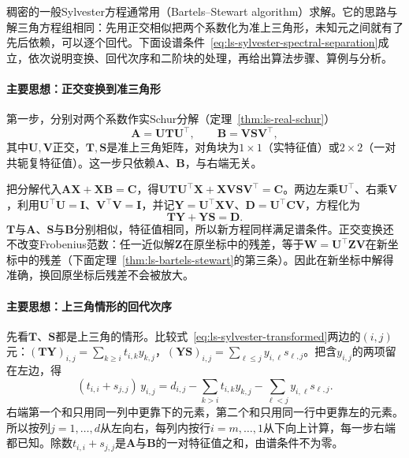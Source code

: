 稠密的一般Sylvester方程通常用（Bartels--Stewart algorithm）求解。它的思路与解三角方程组相同：先用正交相似把两个系数化为准上三角形，未知元之间就有了先后依赖，可以逐个回代。下面设谱条件~\eqref{eq:ls-sylvester-spectral-separation}成立，依次说明变换、回代次序和二阶块的处理，再给出算法步骤、算例与分析。

\paragraph{主要思想：正交变换到准三角形}
第一步，分别对两个系数作实Schur分解（定理~\ref{thm:ls-real-schur}）
\[
 \bm A=\bm U\bm T\bm U^\top,\qquad \bm B=\bm V\bm S\bm V^\top,
\]
其中$\bm U,\bm V$正交，$\bm T,\bm S$是准上三角矩阵，对角块为$1\times1$（实特征值）或$2\times2$（一对共轭复特征值）。这一步只依赖$\bm A$、$\bm B$，与右端无关。

把分解代入$\bm A\bm X+\bm X\bm B=\bm C$，得$\bm U\bm T\bm U^\top\bm X+\bm X\bm V\bm S\bm V^\top=\bm C$。两边左乘$\bm U^\top$、右乘$\bm V$，利用$\bm U^\top\bm U=\bm I$、$\bm V^\top\bm V=\bm I$，并记$\bm Y=\bm U^\top\bm X\bm V$、$\bm D=\bm U^\top\bm C\bm V$，方程化为
\begin{equation}
 \bm T\bm Y+\bm Y\bm S=\bm D .
 \label{eq:ls-sylvester-transformed}
\end{equation}
$\bm T$与$\bm A$、$\bm S$与$\bm B$分别相似，特征值相同，所以新方程同样满足谱条件。正交变换还不改变Frobenius范数：任一近似解$\bm Z$在原坐标中的残差，等于$\bm W=\bm U^\top\bm Z\bm V$在新坐标中的残差（下面定理~\ref{thm:ls-bartels-stewart}的第三条）。因此在新坐标中解得准确，换回原坐标后残差不会被放大。

\paragraph{主要思想：上三角情形的回代次序}
先看$\bm T$、$\bm S$都是上三角的情形。比较式~\eqref{eq:ls-sylvester-transformed}两边的$(i,j)$元：$(\bm T\bm Y)_{i,j}=\sum_{k\geq i}t_{i,k}y_{k,j}$，$(\bm Y\bm S)_{i,j}=\sum_{\ell\leq j}y_{i,\ell}s_{\ell,j}$。把含$y_{i,j}$的两项留在左边，得
\begin{equation}
 (t_{i,i}+s_{j,j})\,y_{i,j}
 =d_{i,j}-\sum_{k>i}t_{i,k}y_{k,j}-\sum_{\ell<j}y_{i,\ell}s_{\ell,j}.
 \label{eq:ls-sylvester-triangular-entry}
\end{equation}
右端第一个和只用同一列中更靠下的元素，第二个和只用同一行中更靠左的元素。所以按列$j=1,\ldots,d$从左向右，每列内按行$i=m,\ldots,1$从下向上计算，每一步右端都已知。除数$t_{i,i}+s_{j,j}$是$\bm A$与$\bm B$的一对特征值之和，由谱条件不为零。

